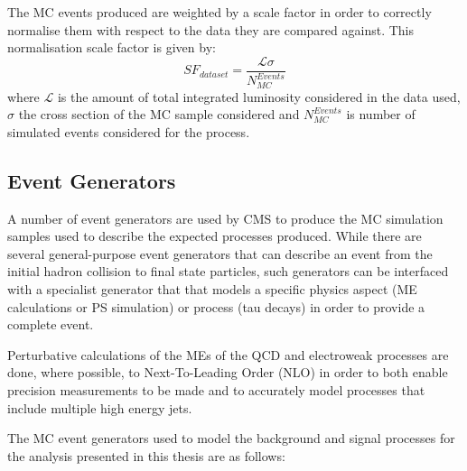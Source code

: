 The MC events produced are weighted by a scale factor in order to correctly normalise them with respect to the data they are compared against.
This normalisation scale factor is given by:
\begin{equation}
SF_{dataset} = \frac{\mathcal{L} \sigma}{N_{MC}^{Events}}
\end{equation}
where $\mathcal{L}$ is the amount of total integrated luminosity considered in the data used, $\sigma$ the cross section of the MC sample considered and $N_{MC}^{Events}$ is number of simulated events considered for the process.


\subsection{Event Generators}\label{subsec:eventGenerators}
A number of event generators are used by CMS to produce the MC simulation samples used to describe the expected processes produced.
While there are several general-purpose event generators that can describe an event from the initial hadron collision to final state particles, such generators can be interfaced with a specialist generator that that models a specific physics aspect (\ie ME calculations or PS simulation) or process (\eg tau decays) in order to provide a complete event.

Perturbative calculations of the MEs of the QCD and electroweak processes are done, where possible, to Next-To-Leading Order (NLO) in order to both enable precision measurements to be made and to accurately model processes that include multiple high energy jets.

The MC event generators used to model the background and signal processes for the analysis presented in this thesis are as follows:

